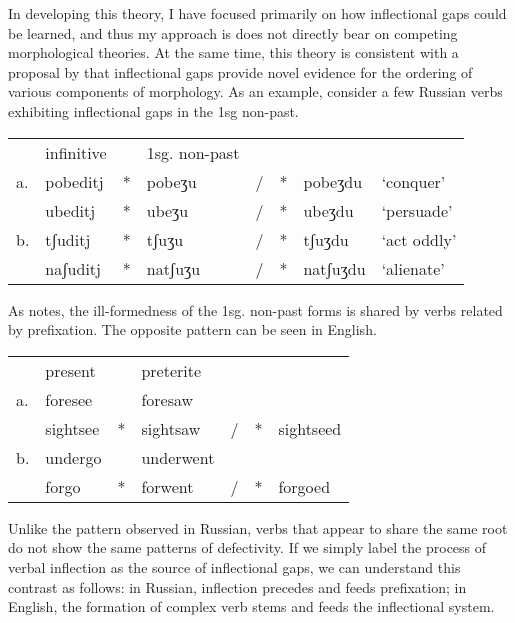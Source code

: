 In developing this theory, I have focused primarily on how inflectional gaps could be learned, and thus my approach is does not directly bear on competing morphological theories. At the same time, this theory is consistent with a proposal by \citet{Pesetsky1977} that inflectional gaps provide novel evidence for the ordering of various components of morphology. As an example, consider a few Russian verbs exhibiting inflectional gaps in the 1sg non-past. 

\begin{example}
\begin{tabular}{l l l@{}l@{}l@{}l@{}l@{} l}
   & infinitive &   & 1sg. non-past \\
a. & pobedit{j} & * & pobeʒu  & / & * & pobeʒdu  & `conquer'   \\
   & ubedit{j}  & * & ubeʒu   & / & * & ubeʒdu   & `persuade'  \\
b. & tʃudit{j}  & * & tʃuʒu   & / & * & tʃuʒdu & `act oddly'   \\
   & naʃudit{j} & * & natʃuʒu & / & * & natʃuʒdu & `alienate'  \\
\end{tabular}
\end{example}

\noindent As \citeauthor{Pesetsky1977} notes, the ill-formedness of the 1sg. non-past forms is shared by verbs related by prefixation. The opposite pattern can be seen in English. 

\begin{example}
\begin{tabular}{l l l@{}l@{}l@{}l@{}l@{}}
   & present  &   & preterite                     \\
a. & foresee  &   & foresaw   &   &   &           \\
   & sightsee & * & sightsaw  & / & * & sightseed \\
b. & undergo  &   & underwent &   &   &           \\
   & forgo    & * & forwent   & / & * & forgoed   \\
\end{tabular}
\end{example}

Unlike the pattern observed in Russian, verbs that appear to share the same root do not show the same patterns of defectivity. If we simply label the process of verbal inflection as the source of inflectional gaps, we can understand this contrast as follows: in Russian, inflection precedes and feeds prefixation; in English, the formation of complex verb stems and feeds the inflectional system. 

